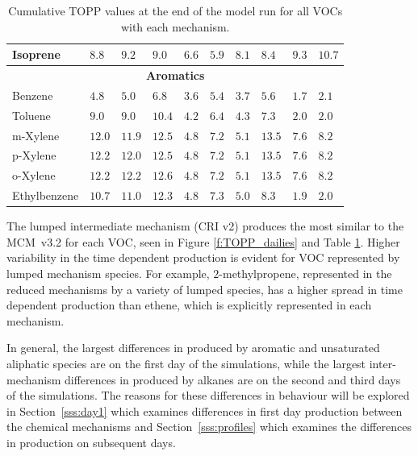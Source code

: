 {\begin{table}
\begin{center}
\begin{tabular}{llllllllll}
                Isoprene & $8.8$ & $9.2$ & $9.0$ & $6.6$ & $5.9$ & $8.1$ & $8.4$ & $9.3$ & $10.7$ \\ \hline
                \multicolumn{10}{c}{\textbf{Aromatics}} \\ \hline 
                Benzene & $4.8$ & $5.0$ & $6.8$ & $3.6$ & $5.4$ & $3.7$ & $5.6$ & $1.7$ & $2.1$ \\
                Toluene & $9.0$ & $9.0$ & $10.4$ & $4.2$ & $6.4$ & $4.3$ & $7.3$ & $2.0$ & $2.0$ \\
                m-Xylene & $12.0$ & $11.9$ & $12.5$ & $4.8$ & $7.2$ & $5.1$ & $13.5$ & $7.6$ & $8.2$ \\
                p-Xylene & $12.2$ & $12.0$ & $12.5$ & $4.8$ & $7.2$ & $5.1$ & $13.5$ & $7.6$ & $8.2$ \\
                o-Xylene & $12.2$ & $12.2$ & $12.6$ & $4.8$ & $7.2$ & $5.1$ & $13.5$ & $7.6$ & $8.2$ \\
                Ethylbenzene & $10.7$ & $11.0$ & $12.3$ & $4.8$ & $7.3$ & $5.0$ & $8.3$ & $1.9$ & $2.0$ \\
                \hline \hline
            \end{tabular}%
            \caption{Cumulative TOPP values at the end of the model run for all VOCs with each mechanism.}%
            \label{t:cumulative_TOPPs}%
        \end{center}%
    \end{table}%
}

The lumped intermediate mechanism (CRI v2) produces the most similar  to the \mbox{MCM v3.2} for each VOC, seen in Figure \ref{f:TOPP_dailies} and Table \ref{t:cumulative_TOPPs}.
Higher variability in the time dependent  production is evident for VOC represented by lumped mechanism species.
For example, $2$-methylpropene, represented in the reduced mechanisms by a variety of lumped species, has a higher spread in time dependent  production than ethene, which is explicitly represented in each mechanism.

In general, the largest differences in  produced by aromatic and unsaturated aliphatic species are on the first day of the simulations, while the largest inter-mechanism differences in  produced by alkanes are on the second and third days of the simulations.
The reasons for these differences in behaviour will be explored in \mbox{Section \ref{sss:day1}} which examines differences in first day  production between the chemical mechanisms and \mbox{Section \ref{sss:profiles}} which examines the differences in  production on subsequent days.
%
